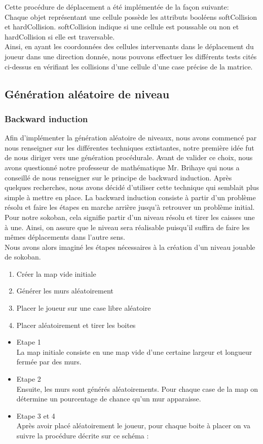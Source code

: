 \documentclass[../main.tex]{subfiles}
\begin{document}
Cette procédure de déplacement a été implémentée de la façon suivante: \\
Chaque objet représentant une cellule possède les attributs booléens softCollision et hardCollision.
softCollision indique si une cellule est poussable ou non et hardCollision si elle est traversable.\\
Ainsi, en ayant les coordonnées des cellules intervenants dans le déplacement du joueur dans une direction donnée, nous pouvons effectuer les différents tests cités ci-dessus en vérifiant les collisions d'une cellule d'une case précise de la matrice.

\subsection{Génération aléatoire de niveau}

\subsubsection{Backward induction}
Afin d'implémenter la génération aléatoire de niveaux, nous avons commencé par nous renseigner sur les différentes techniques extistantes, notre première idée fut de nous diriger vers une génération procédurale.
Avant de valider ce choix, nous avons questionné notre professeur de mathématique Mr. Brihaye qui nous a conseillé de nous renseigner sur le principe de backward induction.
Après quelques recherches, nous avons décidé d'utiliser cette technique qui semblait plus simple à mettre en place.
La backward induction consiste à partir d'un problème résolu et faire les étapes en marche arrière jusqu'à retrouver un problème initial.
Pour notre sokoban, cela signifie partir d'un niveau résolu et tirer les caisses une à une.
Ainsi, on assure que le niveau sera réalisable puisqu'il suffira de faire les mêmes déplacements dans l'autre sens.\\
Nous avons alors imaginé les étapes nécessaires à la création d'un niveau jouable de sokoban.
\begin{enumerate}
	\item Créer la map vide initiale 
	\item Générer les murs aléatoirement
	\item Placer le joueur sur une case libre aléatoire
	\item Placer aléatoirement et tirer les boites
\end{enumerate}
\begin{itemize}
	\item Etape 1\\
		  La map initiale consiste en une map vide d'une certaine largeur et longueur fermée par des murs.
	\item Etape 2\\
		  Ensuite, les murs sont générés aléatoirements. Pour chaque case de la map on détermine un pourcentage de chance qu'un mur apparaisse.
	\item Etape 3 et 4\\
		  Après avoir placé aléatoirement le joueur, pour chaque boite à placer on va suivre la procédure décrite sur ce schéma :\\
\end{itemize}
\end{document}
